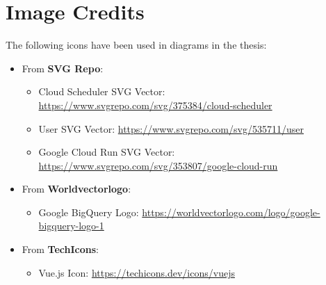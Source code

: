 \documentclass[
	english,
	ruledheaders=section,%
	class=report,%
	thesis={type=bachelor},%
	accentcolor=1b,%
	custommargins=true,%
	marginpar=false,%
	parskip=half-,%
	fontsize=11pt,%
	DIV=14,
]{tudapub}
\begin{document}
\chapter*{Image Credits}\label{section:image_credits}

The following icons have been used in diagrams in the thesis:

\begin{itemize}
    \item From \textbf{SVG Repo}:
    \begin{itemize}
        \item Cloud Scheduler SVG Vector: \url{https://www.svgrepo.com/svg/375384/cloud-scheduler}
        \item User SVG Vector: \url{https://www.svgrepo.com/svg/535711/user}
        \item Google Cloud Run SVG Vector: \url{https://www.svgrepo.com/svg/353807/google-cloud-run}
    \end{itemize}
    
    \item From \textbf{Worldvectorlogo}:
    \begin{itemize}
        \item Google BigQuery Logo: \url{https://worldvectorlogo.com/logo/google-bigquery-logo-1}
    \end{itemize}

    \item From \textbf{TechIcons}:
    \begin{itemize}
        \item Vue.js Icon: \url{https://techicons.dev/icons/vuejs}
    \end{itemize}
\end{itemize}
\printbibliography
\newpage
\mbox{}
\end{document}
